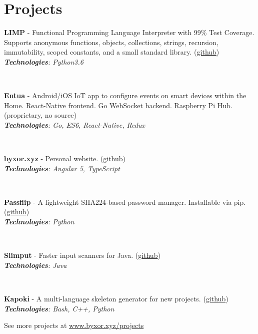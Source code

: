 \documentclass{article}
\begin{document}
\section{Projects}
\vspace{1em}
\begin{multicols}{2}
\parbox{\linewidth}{\textbf{LIMP} - Functional Programming Language Interpreter with 99\% Test Coverage. Supports anonymous functions, objects, collections, strings, recursion, immutability, scoped constants, and a small standard library. (\href{http://www.github.com/byxor/limp}{github})\\
\textit{\textbf{Technologies}: Python3.6}}\vspace{1.5em}\\\parbox{\linewidth}{\textbf{Entua} - Android/iOS IoT app to configure events on smart devices within the Home. React-Native frontend. Go WebSocket backend. Raspberry Pi Hub. (proprietary, no source)\\
\textit{\textbf{Technologies}: Go, ES6, React-Native, Redux}}\vspace{1.5em}\\\parbox{\linewidth}{\textbf{byxor.xyz} - Personal website. (\href{http://www.github.com/byxor/website}{github})\\
\textit{\textbf{Technologies}: Angular 5, TypeScript}}\vspace{1.5em}\\\parbox{\linewidth}{\textbf{Passflip} - A lightweight SHA224-based password manager. Installable via pip. (\href{http://www.github.com/byxor/passflip}{github})\\
\textit{\textbf{Technologies}: Python}}\vspace{1.5em}\\\parbox{\linewidth}{\textbf{Slimput} - Faster input scanners for Java. (\href{http://www.github.com/byxor/slimput}{github})\\
\textit{\textbf{Technologies}: Java}}\vspace{1.5em}\\\parbox{\linewidth}{\textbf{Kapoki} - A multi-language skeleton generator for new projects. (\href{http://www.github.com/byxor/kapoki}{github})\\
\textit{\textbf{Technologies}: Bash, C++, Python}}
\end{multicols}
\begin{center}
\vspace{1em}
See more projects at \url{www.byxor.xyz/projects}
\end{center}
\end{document}
